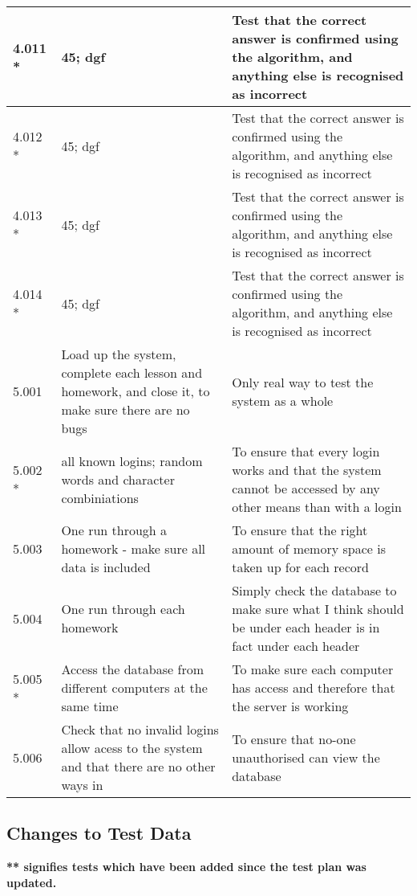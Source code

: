 \begin{landscape}
\begin{center}
\begin{longtable}{|p{4cm}|p{4cm}|p{5cm}|}
4.011 * & 45; dgf & Test that the correct answer is confirmed using the algorithm, and anything else is recognised as incorrect \\ \hline
4.012 * & 45; dgf & Test that the correct answer is confirmed using the algorithm, and anything else is recognised as incorrect \\ \hline
4.013 * & 45; dgf & Test that the correct answer is confirmed using the algorithm, and anything else is recognised as incorrect \\ \hline
4.014 * & 45; dgf & Test that the correct answer is confirmed using the algorithm, and anything else is recognised as incorrect \\ \hline
5.001 & Load up the system, complete each lesson and homework, and close it, to make sure there are no bugs & Only real way to test the system as a whole \\ \hline
5.002 * & all known logins; random words and character combiniations & To ensure that every login works and that the system cannot be accessed by any other means than with a login \\ \hline
5.003 & One run through a homework - make sure all data is included & To ensure that the right amount of memory space is taken up for each record \\ \hline
5.004 & One run through each homework & Simply check the database to make sure what I think should be under each header is in fact under each header \\ \hline
5.005 * & Access the database from different computers at the same time & To make sure each computer has access and therefore that the server is working \\ \hline
5.006 & Check that no invalid logins allow acess to the system and that there are no other ways in & To ensure that no-one unauthorised can view the database \\ \hline
\end{longtable}
\end{center}

\subsection{Changes to Test Data}

\textbf{** signifies tests which have been added since the test plan was updated.}


\end{landscape}
